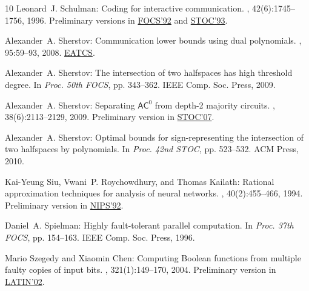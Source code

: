 \begin{thebibliography}{10}
{\sc Leonard~J. Schulman}: Coding for interactive communication.
, 42(6):1745--1756, 1996.
\newblock Preliminary versions in
  \href{http://dx.doi.org/10.1109/SFCS.1992.267778}{FOCS'92} and
  \href{http://dx.doi.org/10.1145/167088.167279}{STOC'93}.
\newblock [\epfmtdoi{10.1109/18.556671}]

{\sc Alexander~A. Sherstov}: Communication lower bounds using dual polynomials.
, 95:59--93, 2008.
\newblock \href{http://www.eatcs.org/images/bulletin/beatcs95.pdf}{EATCS}.

{\sc Alexander~A. Sherstov}: The intersection of two halfspaces has high
  threshold degree.
\newblock In {\em Proc. 50th FOCS}, pp. 343--362. IEEE Comp. Soc. Press, 2009.

{\sc Alexander~A. Sherstov}: Separating {$\mathsf{AC}^0$} from depth-2 majority
  circuits.
, 38(6):2113--2129, 2009.
\newblock Preliminary version in
  \href{http://dx.doi.org/10.1145/1250790.1250834}{STOC'07}.
\newblock [\epfmtdoi{10.1137/08071421X}]

{\sc Alexander~A. Sherstov}: Optimal bounds for sign-representing the
  intersection of two halfspaces by polynomials.
\newblock In {\em Proc. 42nd STOC}, pp. 523--532. ACM Press, 2010.
\newblock [\epfmtdoi{10.1145/1806689.1806762}]

{\sc Kai-Yeung Siu, Vwani~P. Roychowdhury, and Thomas Kailath}: Rational
  approximation techniques for analysis of neural networks.
, 40(2):455--466, 1994.
\newblock Preliminary version in
  \href{http://books.nips.cc/nips05.html}{NIPS'92}.
\newblock [\epfmtdoi{10.1109/18.312168}]

{\sc Daniel~A. Spielman}: Highly fault-tolerant parallel computation.
\newblock In {\em Proc. 37th FOCS}, pp. 154--163. IEEE Comp. Soc. Press, 1996.

{\sc Mario Szegedy and Xiaomin Chen}: Computing {B}oolean functions from
  multiple faulty copies of input bits.
, 321(1):149--170, 2004.
\newblock Preliminary version in
  \href{http://dx.doi.org/10.1007/3-540-45995-2_47}{LATIN'02}.


\end{thebibliography}

